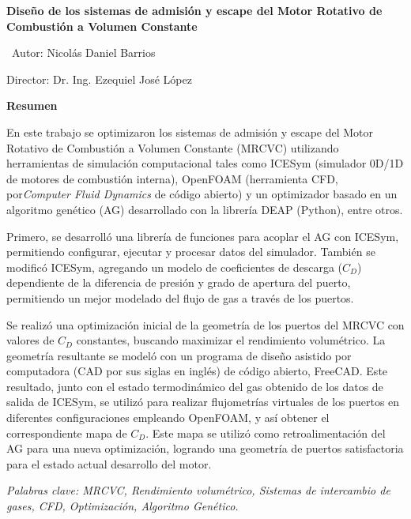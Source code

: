 \newpage \thispagestyle{plain}

\begin{center} \large{\textbf{{Diseño de los sistemas de admisión y escape del
Motor Rotativo de Combustión a Volumen Constante}}}\\
\end{center} %

\normalsize \ \hfill Autor: Nicolás Daniel Barrios

\hfill Director: Dr. Ing. Ezequiel José López


\textbf{Resumen}

En este trabajo se optimizaron los sistemas de admisión y escape del Motor
Rotativo de Combustión a Volumen Constante (MRCVC) utilizando herramientas de
simulación computacional tales como ICESym (simulador 0D/1D de motores de
combustión interna), OpenFOAM (herramienta CFD, por\emph{Computer Fluid
Dynamics} de código abierto) y un optimizador basado en un algoritmo genético
(AG) desarrollado con la librería DEAP (Python), entre otros.

Primero, se desarrolló una librería de funciones para acoplar el AG con ICESym,
permitiendo configurar, ejecutar y procesar datos del simulador.
%
También se modificó ICESym, agregando un modelo de coeficientes de descarga
($C_{D}$) dependiente de la diferencia de presión y grado de apertura del
puerto, permitiendo un mejor modelado del flujo de gas a través de los puertos.

Se realizó una optimización inicial de la geometría de los puertos del MRCVC con
valores de $C_{D}$ constantes, buscando maximizar el rendimiento volumétrico.
%
La geometría resultante se modeló con un programa de diseño asistido por
computadora (CAD por sus siglas en inglés) de código abierto, FreeCAD.
%
Este resultado, junto con el estado termodinámico del gas obtenido de los datos
de salida de ICESym, se utilizó para realizar flujometrías virtuales de los
puertos en diferentes configuraciones empleando OpenFOAM, y así obtener el
correspondiente mapa de $C_{D}$.
%
Este mapa se utilizó como retroalimentación del AG para una nueva optimización,
logrando una geometría de puertos satisfactoria para el estado actual desarrollo
del motor.

\noindent

\textit{Palabras clave: MRCVC, Rendimiento volumétrico, Sistemas de intercambio
de gases, CFD, Optimización, Algoritmo Genético.}

\newpage \thispagestyle{plain} %


